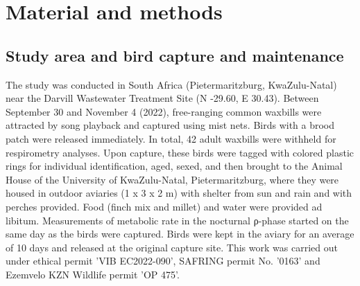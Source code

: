 \documentclass[10pt, twoside]{book} %
\begin{document}
\section{Material and methods}

\subsection{Study area and bird capture and maintenance}

The study was conducted in South Africa (Pietermaritzburg, KwaZulu-Natal) near the Darvill Wastewater Treatment Site (N -29.60, E 30.43). Between September 30 and November 4 (2022), free-ranging common waxbills were attracted by song playback and captured using mist nets. Birds with a brood patch were released immediately. In total, 42 adult waxbills were withheld for respirometry analyses. Upon capture, these birds were tagged with colored plastic rings for individual identification, aged, sexed, and then brought to the Animal House of the University of KwaZulu-Natal, Pietermaritzburg, where they were housed in outdoor aviaries (1 x 3 x 2 m) with shelter from sun and rain and with perches provided. Food (finch mix and millet) and water were provided ad libitum. Measurements of metabolic rate in the nocturnal ρ-phase started on the same day as the birds were captured. Birds were kept in the aviary for an average of 10 days and released at the original capture site. This work was carried out under ethical permit 'VIB EC2022-090', SAFRING permit No. '0163' and Ezemvelo KZN Wildlife permit 'OP 475'. \\
\end{document}
